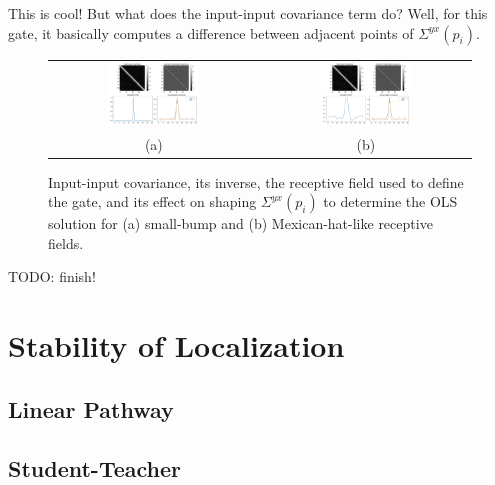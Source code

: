 \documentclass{article}
\begin{document}
This is cool!
But what does the input-input covariance term do?
Well, for this gate, it basically computes a difference between adjacent points of $\Sigma^{yx}(p_i)$.
\begin{figure}
  \centering
  \begin{tabular}{cc}
    \includegraphics[width=0.45\textwidth]{../figs/math/OLS_small_bump.png} &
    \includegraphics[width=0.45\textwidth]{../figs/math/OLS_mexican_hat.png} \\
    (a) & (b)
  \end{tabular}
  \caption{Input-input covariance, its inverse, the receptive field used to define the gate, and its effect on shaping $\Sigma^{yx}(p_i)$ to determine the OLS solution for (a) small-bump and (b) Mexican-hat-like receptive fields.}
  \label{fig:OLS}
\end{figure}


TODO: finish!



\section{Stability of Localization}

\subsection{Linear Pathway}

\subsection{Student-Teacher}
\end{document}

